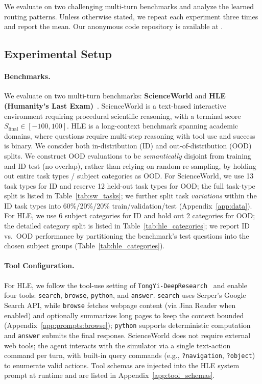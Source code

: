 
We evaluate \method on two challenging multi-turn benchmarks and analyze the learned routing patterns.
Unless otherwise stated, we repeat each experiment three times and report the mean.
Our anonymous code repository is available at \github.

\subsection{Experimental Setup}

\paragraph{Benchmarks.}
We evaluate on two multi-turn benchmarks: \textbf{ScienceWorld} \citep{wang2022scienceworld} and \textbf{HLE (Humanity's Last Exam)}~\citep{phan2025humanitysexam}. 
ScienceWorld is a text-based interactive environment requiring procedural scientific reasoning, with a terminal score $S_{\text{final}} \in [-100, 100]$.
HLE is a long-context benchmark spanning academic domains, where questions require multi-step reasoning with tool use and success is binary.
We consider both in-distribution (ID) and out-of-distribution (OOD) splits.
We construct OOD evaluations to be \emph{semantically} disjoint from training and ID test (no overlap), rather than relying on random re-sampling, by holding out entire task types / subject categories as OOD.
For ScienceWorld, we use 13 task types for ID and reserve 12 held-out task types for OOD; the full task-type split is listed in Table~\ref{tab:sw_tasks}; we further split task \emph{variations} within the ID task types into 60\%/20\%/20\% train/validation/test (Appendix~\ref{app:data}). 
For HLE, we use 6 subject categories for ID and hold out 2 categories for OOD; the detailed category split is listed in Table~\ref{tab:hle_categories}; 
we report ID vs.\ OOD performance by partitioning the benchmark's test questions into the chosen subject groups (Table~\ref{tab:hle_categories}).



\paragraph{Tool Configuration.}
For HLE, we follow the tool-use setting of \texttt{TongYi-DeepResearch}~\citep{team2025tongyi} and enable four tools: \texttt{search}, \texttt{browse}, \texttt{python}, and \texttt{answer}.
\texttt{search} uses Serper's Google Search API, while \texttt{browse} fetches webpage content (via Jina Reader when enabled) and optionally summarizes long pages to keep the context bounded (Appendix~\ref{app:prompts:browse}); \texttt{python} supports deterministic computation and \texttt{answer} submits the final response.
ScienceWorld does not require external web tools; the agent interacts with the simulator via a single text-action command per turn, with built-in query commands (e.g., \texttt{?navigation}, \texttt{?object}) to enumerate valid actions.
Tool schemas are injected into the HLE system prompt at runtime and are listed in Appendix~\ref{app:tool_schemas}.

